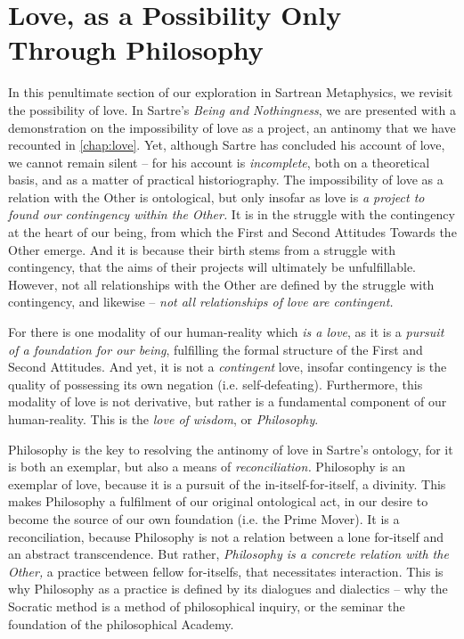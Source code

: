 \chapter{Love, as a Possibility Only Through Philosophy}

In this penultimate section of our exploration in Sartrean Metaphysics, we revisit the possibility of love. In Sartre's \emph{Being and Nothingness}, we are presented with a demonstration on the impossibility of love as a project, an antinomy that we have recounted in \autoref{chap:love}. Yet, although Sartre has concluded his account of love, we cannot remain silent -- for his account is \emph{incomplete}, both on a theoretical basis, and as a matter of practical historiography. The impossibility of love as a relation with the Other is ontological, but only insofar as love is \emph{a project to found our contingency within the Other.} It is in the struggle with the contingency at the heart of our being, from which the First and Second Attitudes Towards the Other emerge. And it is because their birth stems from a struggle with contingency, that the aims of their projects will ultimately be unfulfillable. However, not all relationships with the Other are defined by the struggle with contingency, and likewise -- \emph{not all relationships of love are contingent.}

For there is one modality of our human-reality which \emph{is a love}, as it is a \emph{pursuit of a foundation for our being}, fulfilling the formal structure of the First and Second Attitudes. And yet, it is not a \emph{contingent} love, insofar contingency is the quality of possessing its own negation (i.e. self-defeating). Furthermore, this modality of love is not derivative, but rather is a fundamental component of our human-reality. This is the \emph{love of wisdom}, or \emph{Philosophy}.

Philosophy is the key to resolving the antinomy of love in Sartre's ontology, for it is both an exemplar, but also a means of \emph{reconciliation.} Philosophy is an exemplar of love, because it is a pursuit of the in-itself-for-itself, a divinity. This makes Philosophy a fulfilment of our original ontological act, in our desire to become the source of our own foundation (i.e. the Prime Mover). It is a reconciliation, because Philosophy is not a relation between a lone for-itself and an abstract transcendence. But rather, \emph{Philosophy is a concrete relation with the Other,} a practice between fellow for-itselfs, that necessitates interaction. This is why Philosophy as a practice is defined by its dialogues and dialectics -- why the Socratic method is a method of philosophical inquiry, or the seminar the foundation of the philosophical Academy. 

